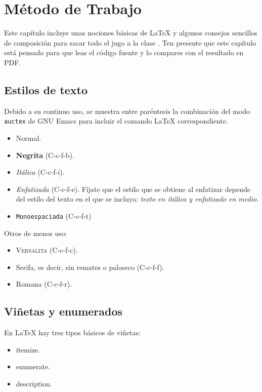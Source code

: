 \chapter{Método de Trabajo}
\label{chap:metodo}

Este capítulo incluye unas nociones básicas de \LaTeX{} y algunos consejos
sencillos de composición para sacar todo el jugo a la clase \esitfg. Ten
presente que este capítulo está pensado para que leas el código fuente y lo
compares con el resultado en PDF.

\section{Estilos de texto}

Debido a su continuo uso, se muestra entre paréntesis la combinación del modo
\texttt{auctex} de GNU Emacs para incluir el comando \LaTeX{} correspondiente.

\begin{itemize}
\item Normal.
\item \textbf{Negrita} (C-c-f-b).
\item \textit{Itálica} (C-c-f-i).
\item \emph{Enfatizada} (C-c-f-e). Fíjate que el estilo que se obtiene al
  enfatizar depende del estilo del texto en el que se incluya: \textit{texto en
    itálica y \emph{enfatizado} en medio}.
\item \texttt{Monoespaciada} (C-c-f-t)
\end{itemize}

Otros de menos uso:

\begin{itemize}
\item \textsc{Versalita} (C-c-f-c).
\item \textsf{Serifa}, es decir, sin remates o paloseco (C-c-f-f).
\item \textrm{Romana} (C-c-f-r).
\end{itemize}


\section{Viñetas y enumerados}

En \LaTeX{} hay tres tipos básicos de viñetas:

\begin{itemize}
\item itemize.
\item enumerate.
\item description.
\end{itemize}


